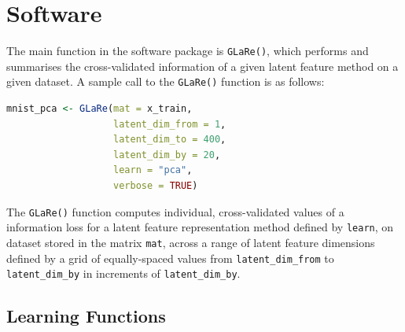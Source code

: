 \section{Software}\label{sec:software}

The main function in the  software package is \texttt{GLaRe()}, which performs and summarises the cross-validated information of a given latent feature method on a given dataset.
A sample call to the \texttt{GLaRe()} function is as follows:
\begin{lstlisting}[language=R]
mnist_pca <- GLaRe(mat = x_train,
                   latent_dim_from = 1,
                   latent_dim_to = 400,
                   latent_dim_by = 20,
                   learn = "pca",
                   verbose = TRUE)
\end{lstlisting}
The \texttt{GLaRe()} function computes individual, cross-validated values of a information loss for a latent feature representation method defined by \texttt{learn}, on dataset stored in the matrix \texttt{mat}, across a range of latent feature dimensions defined by a grid of equally-spaced values from \texttt{latent\_dim\_from} to \texttt{latent\_dim\_by} in increments of \texttt{latent\_dim\_by}.

\subsection{Learning Functions}\label{sec:learning-functions}

